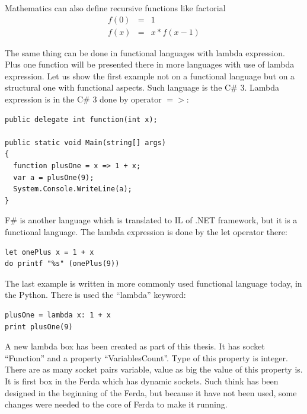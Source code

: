 \documentclass[a4paper,12pt]{book}
\begin{document}
Mathematics can also define recursive functions like factorial
\begin{eqnarray*}
f(0)&=&1\\
f(x)&=&x * f(x - 1)
\end{eqnarray*}

The same thing can be done in functional languages with lambda expression. Plus one function will be presented there in more languages with use of lambda expression. Let us show the first example not on a functional language but on a structural one with functional aspects. Such language is the C\# 3. Lambda expression is in the C\# 3 done by operator $=>$:

\begin{verbatim}
public delegate int function(int x);

public static void Main(string[] args)
{
  function plusOne = x => 1 + x;
  var a = plusOne(9);
  System.Console.WriteLine(a);
}
\end{verbatim}

F\# is another language which is translated to IL of .NET framework, but it is a functional language. The lambda expression is done by the let operator there:
\begin{verbatim}
let onePlus x = 1 + x
do printf "%s" (onePlus(9)) 
\end{verbatim}

The last example is written in more commonly used functional language today, in the Python. There is used the ``lambda'' keyword:
\begin{verbatim}
plusOne = lambda x: 1 + x
print plusOne(9)
\end{verbatim}

A new lambda box has been created as part of this thesis. It has socket ``Function'' and a property ``VariablesCount''. Type of this property is integer. There are as many socket pairs variable, value as big the value of this property is. It is first box in the Ferda which has dynamic sockets. Such think has been designed in the beginning of the Ferda, but because it have not been used, some changes were needed to the core of Ferda to make it running.
\end{document}
